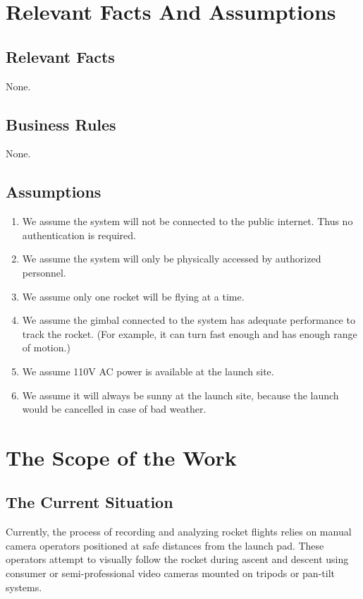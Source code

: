 \documentclass[12pt]{article}
\begin{document}
\section{Relevant Facts And Assumptions}
\subsection{Relevant Facts}

None.

\subsection{Business Rules}

None.

\subsection{Assumptions}

\begin{enumerate}
  \item We assume the system will not be connected to the public internet. Thus no
        authentication is required.
  \item We assume the system will only be physically accessed by authorized personnel.
  \item We assume only one rocket will be flying at a time.
  \item We assume the gimbal connected to the system has adequate performance to track
        the rocket. (For example, it can turn fast enough and has enough range of
        motion.)
  \item We assume 110V AC power is available at the launch site.
  \item We assume it will always be sunny at the launch site, because the launch would
        be cancelled in case of bad weather.
\end{enumerate}

\section{The Scope of the Work}
\subsection{The Current Situation}

Currently, the process of recording and analyzing rocket flights relies on
manual camera operators positioned at safe distances from the launch pad. These
operators attempt to visually follow the rocket during ascent and descent using
consumer or semi-professional video cameras mounted on tripods or pan-tilt
systems.
\end{document}
